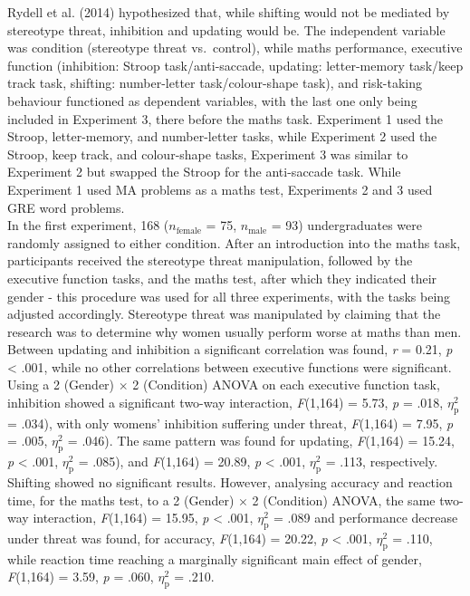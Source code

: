 \documentclass[
  stu,floatsintext]{apa7}
\begin{document}
Rydell et al. (2014) hypothesized that, while shifting would not be mediated by stereotype threat, inhibition and updating would be.
The independent variable was condition (stereotype threat vs.~control), while maths performance, executive function (inhibition: Stroop task/anti-saccade, updating: letter-memory task/keep track task, shifting: number-letter task/colour-shape task), and risk-taking behaviour functioned as dependent variables, with the last one only being included in Experiment 3, there before the maths task.
Experiment 1 used the Stroop, letter-memory, and number-letter tasks, while Experiment 2 used the Stroop, keep track, and colour-shape tasks, Experiment 3 was similar to Experiment 2 but swapped the Stroop for the anti-saccade task.
While Experiment 1 used MA problems as a maths test, Experiments 2 and 3 used GRE word problems.\\
In the first experiment, 168 (\(n_{\text{female}}\) = 75, \(n_{\text{male}}\) = 93) undergraduates were randomly assigned to either condition.
After an introduction into the maths task, participants received the stereotype threat manipulation, followed by the executive function tasks, and the maths test, after which they indicated their gender - this procedure was used for all three experiments, with the tasks being adjusted accordingly.
Stereotype threat was manipulated by claiming that the research was to determine why women usually perform worse at maths than men.\\
Between updating and inhibition a significant correlation was found, \emph{r} = 0.21, \emph{p} \textless{} .001, while no other correlations between executive functions were significant.
Using a 2 (Gender) \(\times\) 2 (Condition) ANOVA on each executive function task, inhibition showed a significant two-way interaction, \emph{F}(1,164) = 5.73, \emph{p} = .018, \(\eta^{2}_{\text{p}}\) = .034), with only womens' inhibition suffering under threat, \emph{F}(1,164) = 7.95, \emph{p} = .005, \(\eta^{2}_{\text{p}}\) = .046).
The same pattern was found for updating, \emph{F}(1,164) = 15.24, \emph{p} \textless{} .001, \(\eta^{2}_{\text{p}}\) = .085), and \emph{F}(1,164) = 20.89, \emph{p} \textless{} .001, \(\eta^{2}_{\text{p}}\) = .113, respectively.
Shifting showed no significant results.
However, analysing accuracy and reaction time, for the maths test, to a 2 (Gender) \(\times\) 2 (Condition) ANOVA, the same two-way interaction, \emph{F}(1,164) = 15.95, \emph{p} \textless{} .001, \(\eta^{2}_{\text{p}}\) = .089 and performance decrease under threat was found, for accuracy, \emph{F}(1,164) = 20.22, \emph{p} \textless{} .001, \(\eta^{2}_{\text{p}}\) = .110, while reaction time reaching a marginally significant main effect of gender, \emph{F}(1,164) = 3.59, \emph{p} = .060, \(\eta^{2}_{\text{p}}\) = .210.
\end{document}
